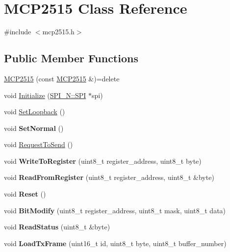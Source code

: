 \hypertarget{class_m_c_p2515}{}\section{M\+C\+P2515 Class Reference}
\label{class_m_c_p2515}


{\ttfamily \#include $<$mcp2515.\+h$>$}

\subsection*{Public Member Functions}
\begin{DoxyCompactItemize}
\item 
\hyperlink{class_m_c_p2515_a8cd4111604b740feb758bd4d077f4fb8}{M\+C\+P2515} (const \hyperlink{class_m_c_p2515}{M\+C\+P2515} \&)=delete
\item 
void \hyperlink{class_m_c_p2515_a41921933b4f2595e8935f8432dd8d65b}{Initialize} (\hyperlink{class_s_p_i___n_1_1_s_p_i}{S\+P\+I\+\_\+\+N\+::\+S\+PI} $\ast$spi)
\item 
void \hyperlink{class_m_c_p2515_a7aac5fdb713b83933391348f1188f2b9}{Set\+Loopback} ()
\item 
void {\bfseries Set\+Normal} ()\hypertarget{class_m_c_p2515_a58601a9d30863ebac441d641ddfac44e}{}\label{class_m_c_p2515_a58601a9d30863ebac441d641ddfac44e}

\item 
void \hyperlink{class_m_c_p2515_a5a218199ca1dfcb25cb95890bc0220fc}{Request\+To\+Send} ()
\item 
void {\bfseries Write\+To\+Register} (uint8\+\_\+t register\+\_\+address, uint8\+\_\+t byte)\hypertarget{class_m_c_p2515_adbc005a5975b77b0aef74363f3832f9b}{}\label{class_m_c_p2515_adbc005a5975b77b0aef74363f3832f9b}

\item 
void {\bfseries Read\+From\+Register} (uint8\+\_\+t register\+\_\+address, uint8\+\_\+t \&byte)\hypertarget{class_m_c_p2515_a09ef6973daccbf868d89986e727cfa1b}{}\label{class_m_c_p2515_a09ef6973daccbf868d89986e727cfa1b}

\item 
void {\bfseries Reset} ()\hypertarget{class_m_c_p2515_aa4d4138b984dc87116cf72ae104acb70}{}\label{class_m_c_p2515_aa4d4138b984dc87116cf72ae104acb70}

\item 
void {\bfseries Bit\+Modify} (uint8\+\_\+t register\+\_\+address, uint8\+\_\+t mask, uint8\+\_\+t data)\hypertarget{class_m_c_p2515_aa9a35fe139adf1fccaaceec561544c14}{}\label{class_m_c_p2515_aa9a35fe139adf1fccaaceec561544c14}

\item 
void {\bfseries Read\+Status} (uint8\+\_\+t \&byte)\hypertarget{class_m_c_p2515_ae466f10eea5ccf0f36439757d4baf6b5}{}\label{class_m_c_p2515_ae466f10eea5ccf0f36439757d4baf6b5}

\item 
void {\bfseries Load\+Tx\+Frame} (uint16\+\_\+t id, uint8\+\_\+t byte, uint8\+\_\+t buffer\+\_\+number)\hypertarget{class_m_c_p2515_af52ebd6ba07f580b2be8facbe8039855}{}\label{class_m_c_p2515_af52ebd6ba07f580b2be8facbe8039855}

\end{DoxyCompactItemize}
